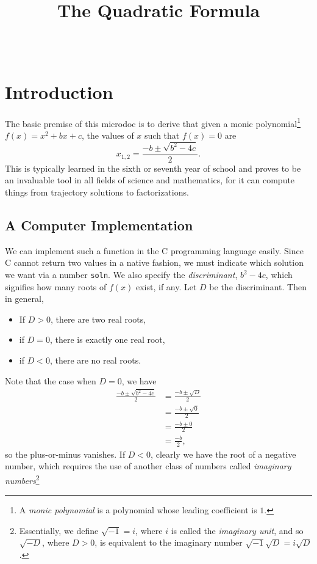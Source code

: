 \documentclass{microdoc}
\title{The Quadratic Formula}
\author{\authab{Robert Smith}{Quad's Printing}{quadricode@gmail.com}\\
        \autha{Nima Talebi}{Autonomy Corporation Pty Ltd}}
\begin{document}
\maketitle

\section{Introduction}
The basic premise of this microdoc is to derive that given a monic
polynomial\footnote{A \emph{monic polynomial} is a polynomial whose
  leading coefficient is $1$.} $f(x)=x^2+bx+c$, the values of $x$ such
that $f(x)=0$ are \[x_{1,2}= \frac{-b\pm\sqrt{b^2-4c}}{2}.\] This is
typically learned in the sixth or seventh year of school and proves to
be an invaluable tool in all fields of science and mathematics, for it
can compute things from trajectory solutions to factorizations.

\subsection{A Computer Implementation}
We can implement such a function in the C programming language
easily. Since C cannot return two values in a native fashion, we must
indicate which solution we want via a number \verb|soln|. We also
specify the \emph{discriminant}, $b^2-4c$, which signifies how many
roots of $f(x)$ exist, if any. Let $D$ be the discriminant. Then in general,
\begin{itemize}
  \item If $D>0$, there are two real roots,
  \item if $D=0$, there is exactly one real root,
  \item if $D<0$, there are no real roots.
\end{itemize}
Note that the case when $D=0$, we have
\begin{align*}
  \frac{-b\pm\sqrt{b^2-4c}}{2} &= \frac{-b\pm\sqrt{D}}{2}\\
                               &= \frac{-b\pm\sqrt{0}}{2}\\
                               &= \frac{-b\pm 0}{2}\\
                               &= \frac{-b}{2},
\end{align*}
so the plus-or-minus vanishes. If $D<0$, clearly we have the root of a
negative number, which requires the use of another class of numbers
called \emph{imaginary numbers}\footnote{Essentially, we define
  $\sqrt{-1} = i$, where $i$ is called the \emph{imaginary unit}, and
  so $\sqrt{-D}$, where $D>0$, is equivalent to the imaginary number
  $\sqrt{-1}\sqrt{D}=i\sqrt{D}$.}
\end{document}
